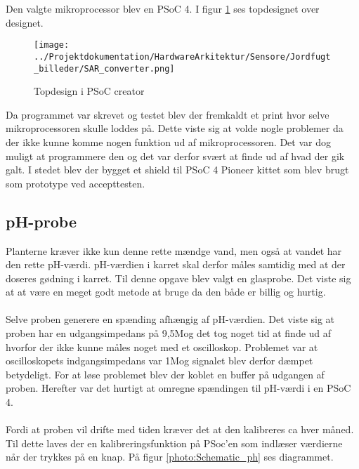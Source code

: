 Den valgte mikroprocessor blev en PSoC 4. I figur \ref{photo:PSoC_Creator} ses topdesignet over designet. 

\begin{figure}[H]
	\centering 
	\texttt{[image: ../Projektdokumentation/HardwareArkitektur/Sensore/Jordfugt\_billeder/SAR\_converter.png]}
	\caption{Topdesign i PSoC creator}
	\label{photo:PSoC_Creator}
\end{figure} 

Da programmet var skrevet og testet blev der fremkaldt et print hvor selve mikroprocessoren skulle loddes på. Dette viste sig at volde nogle problemer da der ikke kunne komme nogen funktion ud af mikroprocessoren. Det var dog muligt at programmere den og det var derfor svært at finde ud af hvad der gik galt. I stedet blev der bygget et shield til PSoC 4 Pioneer kittet som blev brugt som prototype ved accepttesten. 

\subsection{pH-probe}
Planterne kræver ikke kun denne rette mændge vand, men også at vandet har den rette pH-værdi. pH-værdien i karret skal derfor måles samtidig med at der doseres gødning i karret. Til denne opgave blev valgt en glasprobe. Det viste sig at at være en meget godt metode at bruge da den både er billig og hurtig.
\\\\
Selve proben generere en spænding afhængig af pH-værdien. Det viste sig at proben har en udgangsimpedans på 9,5M\ohm og det tog noget tid at finde ud af hvorfor der ikke kunne måles noget med et oscilloskop. Problemet var at oscilloskopets indgangsimpedans var 1M\ohm og signalet blev derfor dæmpet betydeligt. For at løse problemet blev der koblet en buffer på udgangen af proben. Herefter var det hurtigt at omregne spændingen til pH-værdi i en PSoC 4. 
\\\\
Fordi at proben vil drifte med tiden kræver det at den kalibreres ca hver måned. Til dette laves der en kalibreringsfunktion på PSoc'en som indlæser værdierne når der trykkes på en knap. På figur \ref{photo:Schematic_ph} ses diagrammet.

